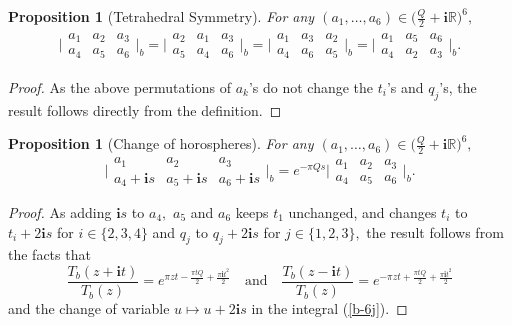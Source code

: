 \documentclass[11pt]{article}
\newtheorem{proposition}[theorem]{Proposition}
\theoremstyle{remark}
\theoremstyle{remark}
\numberwithin{equation}{section}
\begin{document}
\begin{proposition}[Tetrahedral Symmetry]\label{tetrasym}
For any $(a_1,\dots,a_6)\in \big( \frac{Q}{2}+ \mathbf i \mathbb R\big)^6,$ 
\begin{align}
 \bigg|\begin{matrix} 
      a_1 & a_2 & a_3 \\
      a_4 & a_5 & a_6
\end{matrix} \bigg|_b= \bigg|\begin{matrix} 
      a_2 & a_1 & a_3 \\
      a_5 & a_4 & a_6
\end{matrix} \bigg|_b= \bigg|\begin{matrix} 
      a_1 & a_3 & a_2 \\
      a_4 & a_6 & a_5
 \end{matrix} \bigg|_b= \bigg|\begin{matrix}  
      a_1 & a_5 & a_6 \\
      a_4 & a_2 & a_3
 \end{matrix} \bigg|_b.
\end{align}
\end{proposition}

\begin{proof} As the above permutations of $a_k$'s do not change the $t_i$'s and $q_j$'s, the result follows directly from the definition.
\end{proof}

\begin{proposition}[Change of horospheres]\label{prop: horosphere}
For any $(a_1,\dots,a_6)\in \big( \frac{Q}{2}+ \mathbf i \mathbb R\big)^6,$ 
\begin{equation}\label{coh}
  \bigg|\begin{matrix}  a_1 & a_2 & a_3  \\ a_4 +\mathbf is & a_5+\mathbf is & a_6 +\mathbf is \end{matrix}  \bigg|_b= e^{-{\pi} Qs}\bigg|\begin{matrix}  a_1 & a_2 & a_3  \\ a_4 & a_5 & a_6 \end{matrix}\bigg|_b.  
\end{equation}
\end{proposition}

\begin{proof} As adding $\mathbf is$ to $a_4,$ $a_5$ and $a_6$ keeps $t_1$ unchanged, and changes $t_i$ to $t_i+2\mathbf is$ for $i\in\{2,3,4\}$ and $q_j$ to $q_j+2\mathbf is$ for $j\in\{1,2,3\},$ the result follows from the facts that 
\begin{equation}\label{TT}
    \frac{T_b(z+\mathbf i t)}{T_b(z)}=e^{\pi zt -\frac{\pi tQ}{2} +\frac{\pi\mathbf i t^2}{2}}\quad\text{and}\quad \frac{T_b(z-\mathbf i t)}{T_b(z)}=e^{-\pi zt +\frac{\pi tQ}{2} +\frac{\pi\mathbf i t^2}{2}}
\end{equation}
and the  change of variable $u\mapsto u+2\mathbf is$ in the integral (\ref{b-6j}).
\end{proof}
\end{document}
